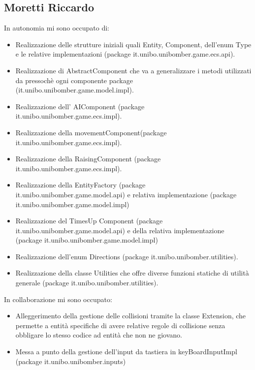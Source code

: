 \documentclass[a4paper,12pt]{report}
\begin{document}
\subsection*{Moretti Riccardo}
In autonomia mi sono occupato di:
\begin{itemize}
    \item Realizzazione delle strutture iniziali quali Entity, Component, dell’enum Type e le relative implementazioni (package it.unibo.unibomber.game.ecs.api).
    \item Realizzazione di AbstractComponent che va a generalizzare i metodi utilizzati da pressochè ogni componente package (it.unibo.unibomber.game.model.impl).
    \item Realizzazione dell’ AIComponent (package it.unibo.unibomber.game.ecs.impl).
    \item Realizzazione della movementComponent(package it.unibo.unibomber.game.ecs.impl).
    \item Realizzazione della RaisingComponent (package it.unibo.unibomber.game.ecs.impl).
    \item Realizzazione della EntityFactory (package it.unibo.unibomber.game.model.api) e relativa implementazione (package it.unibo.unibomber.game.model.impl)
    \item Realizzazione del TimesUp Component (package it.unibo.unibomber.game.model.api) e della relativa implementazione (package it.unibo.unibomber.game.model.impl)
    \item Realizzazione dell’enum Directions (package it.unibo.unibomber.utilities).
    \item Realizzazione della classe Utilities che offre diverse funzioni statiche di utilità generale (package it.unibo.unibomber.utilities).
\end{itemize}
In collaborazione mi sono occupato:
\begin{itemize}
    \item Alleggerimento della gestione delle collisioni tramite la classe Extension, che permette a entità specifiche di avere relative regole di collisione senza obbligare lo stesso codice ad entità che non ne giovano.
    \item Messa a punto della gestione
          dell’input da tastiera in keyBoardInputImpl (package it.unibo.unibomber.inputs)
\end{itemize}
\end{document}
